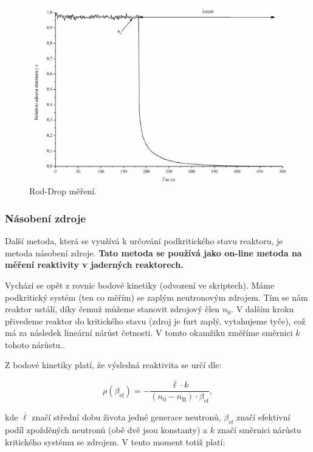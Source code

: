 \begin{figure}[H]
    \centering
    \includegraphics[scale=0.4]{img/RodDrop.png}
    \caption{Rod-Drop měření.}
    \label{fig:Rod-Drop}
\end{figure}

\subsubsection{Násobení zdroje}

Další metoda, která se využívá k určování podkritického stavu reaktoru, je metoda násobení zdroje. \textbf{Tato metoda se používá jako on-line metoda na měření reaktivity v jaderných reaktorech.}

Vychází se opět z rovnic bodové kinetiky (odvození ve skriptech). Máme podkritický systém (ten co měřím) se zaplým neutronovým zdrojem. Tím se nám reaktor ustálí, díky čemuž můžeme stanovit zdrojový člen $n_0$. V dalším kroku přivedeme reaktor do kritického stavu (zdroj je furt zaplý, vytahujeme tyče), což má za následek lineární nárůst četnosti. V tomto okamžiku změříme směrnici $k$ tohoto nárůstu..

Z bodové kinetiky platí, že výsledná reaktivita se určí dle:

\begin{equation}
    \boxed{ \rho (\beta_\text{ef}) = -\frac{\overline{\ell}\cdot k}{(n_\text{0} - n_\text{B}) \cdot \beta_\text{ef}}, }
\end{equation}

kde $\overline{\ell}$ značí střední dobu života jedné generace neutronů, $\beta_\text{ef}$  značí efektivní podíl zpožděných neutronů (obě dvě jsou konstanty) a $k$ značí směrnici nárůstu kritického systému se zdrojem. V tento moment totiž platí:

